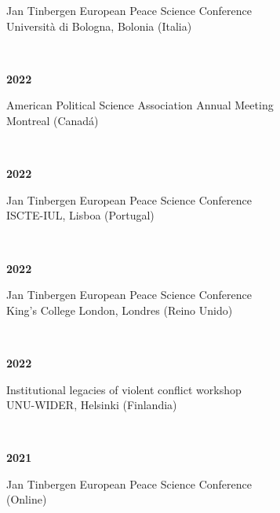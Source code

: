 \documentclass[a4paper, 12pt]{article}
\begin{document}
{\begin{minipage}[t]{0.9\textwidth}
Jan Tinbergen European Peace Science Conference\\
Università di Bologna, Bolonia (Italia)\\
\end{minipage}\\
\begin{minipage}[t]{0.1\textwidth}
\textbf{2022}
\end{minipage}\hfill\begin{minipage}[t]{0.9\textwidth}
American Political Science Association Annual Meeting\\
Montreal (Canadá)\\
\end{minipage}\\
\begin{minipage}[t]{0.1\textwidth}
\textbf{2022}
\end{minipage}\hfill\begin{minipage}[t]{0.9\textwidth}
Jan Tinbergen European Peace Science Conference\\
ISCTE-IUL, Lisboa (Portugal)\\
\end{minipage}\\
\begin{minipage}[t]{0.1\textwidth}
\textbf{2022}
\end{minipage}\hfill\begin{minipage}[t]{0.9\textwidth}
Jan Tinbergen European Peace Science Conference\\
King's College London, Londres (Reino Unido)\\
\end{minipage}\\
\begin{minipage}[t]{0.1\textwidth}
\textbf{2022}
\end{minipage}\hfill\begin{minipage}[t]{0.9\textwidth}
Institutional legacies of violent conflict workshop\\
UNU-WIDER, Helsinki (Finlandia)\\
\end{minipage}\\
\begin{minipage}[t]{0.1\textwidth}
\textbf{2021}
\end{minipage}\hfill\begin{minipage}[t]{0.9\textwidth}
Jan Tinbergen European Peace Science Conference\\
(Online)\\
\end{minipage}\\
}
\end{document}

